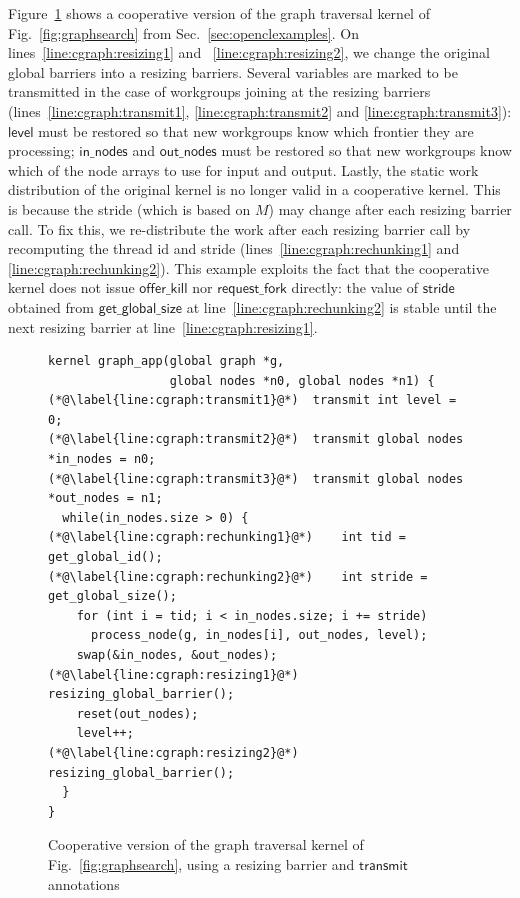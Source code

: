 \documentclass[sigconf]{acmart}
\newcommand{\myfig}{Fig.~}
\newcommand{\myfiglong}{Figure~}
\newcommand{\mysec}{Sec.~}
\newcommand{\transmit}{\mathsf{transmit}}
\newcommand{\offerfork}{\mathsf{request\_fork}}
\newcommand{\offerkill}{\mathsf{offer\_kill}}
\newcommand{\getglobalsize}{\mathsf{get\_global\_size}}
\newcommand{\keyword}[1]{\mathsf{#1}}
\begin{document}
{
\myfiglong\ref{fig:cgraphsearch} shows a cooperative version of the
graph traversal kernel of \myfig\ref{fig:graphsearch} from
\mysec\ref{sec:openclexamples}.  On lines~\ref{line:cgraph:resizing1}
and ~\ref{line:cgraph:resizing2}, we change the original global
barriers into a resizing barriers. Several variables are marked to be
transmitted in the case of workgroups joining at the resizing barriers
(lines~\ref{line:cgraph:transmit1}, \ref{line:cgraph:transmit2} and
\ref{line:cgraph:transmit3}): $\keyword{level}$ must be restored so
that new workgroups know which frontier they are processing;
$\keyword{in\_nodes}$ and $\keyword{out\_nodes}$ must be restored so
that new workgroups know which of the node arrays to use for input and
output. Lastly, the static work distribution of the original kernel is
no longer valid in a cooperative kernel. This is because the stride
(which is based on $M$) may change after each resizing barrier
call. To fix this, we re-distribute the work after each resizing
barrier call by recomputing the thread id and stride
(lines~\ref{line:cgraph:rechunking1} and
\ref{line:cgraph:rechunking2}). This example exploits the fact that
the cooperative kernel does not issue $\offerkill$ nor $\offerfork$
directly: the value of $\keyword{stride}$ obtained from
$\getglobalsize$ at line~\ref{line:cgraph:rechunking2} is stable
until the next resizing barrier at line~\ref{line:cgraph:resizing1}.

\begin{figure}

\begin{lstlisting}
kernel graph_app(global graph *g,
                 global nodes *n0, global nodes *n1) {
(*@\label{line:cgraph:transmit1}@*)  transmit int level = 0;
(*@\label{line:cgraph:transmit2}@*)  transmit global nodes *in_nodes = n0;
(*@\label{line:cgraph:transmit3}@*)  transmit global nodes *out_nodes = n1;
  while(in_nodes.size > 0) {
(*@\label{line:cgraph:rechunking1}@*)    int tid = get_global_id();
(*@\label{line:cgraph:rechunking2}@*)    int stride = get_global_size();
    for (int i = tid; i < in_nodes.size; i += stride)
      process_node(g, in_nodes[i], out_nodes, level);
    swap(&in_nodes, &out_nodes);
(*@\label{line:cgraph:resizing1}@*)    resizing_global_barrier();
    reset(out_nodes);
    level++;
(*@\label{line:cgraph:resizing2}@*)    resizing_global_barrier();
  }
}
\end{lstlisting}
\caption{Cooperative version of the graph traversal kernel of \myfig\ref{fig:graphsearch}, using a resizing barrier and $\transmit$ annotations}\label{fig:cgraphsearch}
\end{figure}

}
\end{document}
